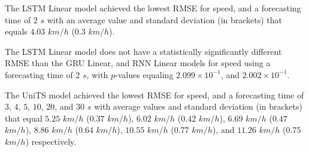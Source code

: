 The LSTM Linear model achieved the lowest RMSE for speed, and a forecasting time of $2$ $s$ with an average value and standard deviation (in brackets) that equals $4.03$ $km/h$ ($0.3$ $km/h$).

The LSTM Linear model does not have a statistically significantly different RMSE than the GRU Linear, and RNN Linear models for speed using a forecasting time of $2$ $s$, with $p$-values equaling $2.099 \times 10^{-1}$, and $2.002 \times 10^{-1}$.


The UniTS model achieved the lowest RMSE for speed, and a forecasting time of $3$, $4$, $5$, $10$, $20$, and $30$ $s$ with average values and standard deviation (in brackets) that equal $5.25$ $km/h$ ($0.37$ $km/h$), $6.02$ $km/h$ ($0.42$ $km/h$), $6.69$ $km/h$ ($0.47$ $km/h$), $8.86$ $km/h$ ($0.64$ $km/h$), $10.55$ $km/h$ ($0.77$ $km/h$), and $11.26$ $km/h$ ($0.75$ $km/h$) respectively.

